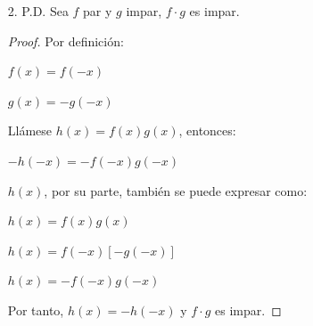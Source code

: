 \documentclass{article}
\begin{document}
\begin{enumerate}
\begin{enumerate}
\begin{enumerate}
\begin{proof}
                Llámese \( h(x) = \frac{f(x)}{g(x)} \), entonces:
                
                \( -h(-x) = -\frac{f(-x)}{g(-x)} \)
                \vspace{\baselineskip}
                
                Ahora, \( h(x) \) también es:
                
                \( h(x) = \frac{f(x)}{g(x)} \)
                
                \( h(x) = \frac{f(-x)}{-g(-x)} \)
                
                \( h(x) = -\frac{f(-x)}{g(-x)} \)
                \vspace{\baselineskip}
                
                Así:
                
                \( h(x) = -h(-x) \), por lo tanto, \( \frac{f}{g} \) es impar.
                \end{proof}
                
                \item[2.] P.D. Sea \( f \) par y \( g \) impar, \( f \cdot g \) es impar.
                
                \begin{proof} Por definición:
                
                \( f(x) = f(-x) \)
                
                \( g(x) = -g(-x) \)
                \vspace{\baselineskip}
                
                Llámese \( h(x) = f(x)g(x) \), entonces:
                
                \( -h(-x) = -f(-x)g(-x) \)
                \vspace{\baselineskip}
                
                \( h(x) \), por su parte, también se puede expresar como:
                
                \( h(x) = f(x)g(x) \)
                
                \( h(x) = f(-x)[-g(-x)] \)
                
                \( h(x) = -f(-x)g(-x) \)
                \vspace{\baselineskip}
                
                Por tanto, \( h(x) = -h(-x) \) y \( f \cdot g \) es impar.
                \end{proof}
            \end{enumerate}
            \vspace{\baselineskip}
            

\end{enumerate}
\end{enumerate}
\end{document}
